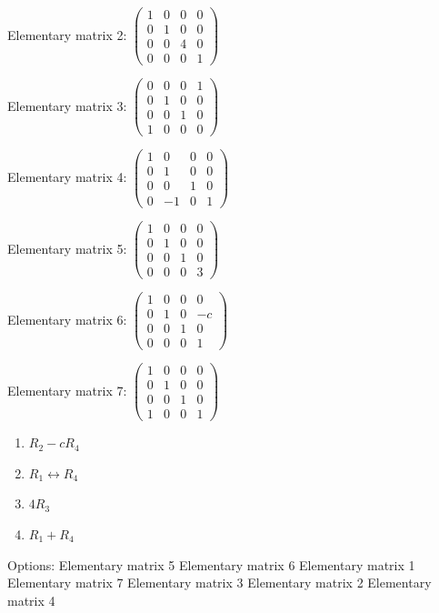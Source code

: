 \documentclass[10pt,a4paper]{article}
\begin{document}
Elementary matrix 2: \(\begin{pmatrix}1&0&0&0\\0&1&0&0\\0&0&4&0\\0&0&0&1\end{pmatrix}\)

Elementary matrix 3: \(\begin{pmatrix}0&0&0&1\\0&1&0&0\\0&0&1&0\\1&0&0&0\end{pmatrix}\)

Elementary matrix 4: \(\begin{pmatrix}1&0&0&0\\0&1&0&0\\0&0&1&0\\0&-1&0&1\end{pmatrix}\)

Elementary matrix 5: \(\begin{pmatrix}1&0&0&0\\0&1&0&0\\0&0&1&0\\0&0&0&3\end{pmatrix}\)

Elementary matrix 6: \(\begin{pmatrix}1&0&0&0\\0&1&0&-c\\0&0&1&0\\0&0&0&1\end{pmatrix}\)

Elementary matrix 7: \(\begin{pmatrix}1&0&0&0\\0&1&0&0\\0&0&1&0\\1&0&0&1\end{pmatrix}\)

\begin{enumerate}[label=(\alph*)]
\item \(R_2-cR_4\)
\item \(R_1\leftrightarrow R_4\)
\item \(4R_3\)
\item \(R_1+R_4\)
\end{enumerate}
\quad Options: Elementary matrix 5 \textbar{} Elementary matrix 6 \textbar{} Elementary matrix 1 \textbar{} Elementary matrix 7 \textbar{} Elementary matrix 3 \textbar{} Elementary matrix 2 \textbar{} Elementary matrix 4
\end{document}

